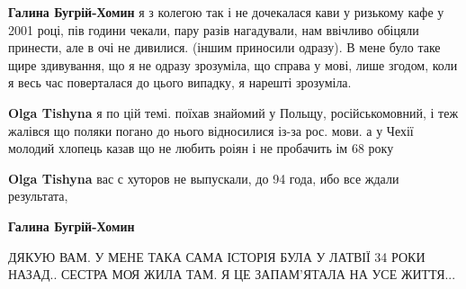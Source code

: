 \begin{itemize}
\begin{itemize}
 
\textbf{Галина Бугрій-Хомин} я з колегою так і не дочекалася кави у ризькому
кафе у 2001 році, пів години чекали, пару разів нагадували, нам ввічливо
обіцяли принести, але в очі не дивилися. (іншим приносили одразу). В мене було
таке щире здивування, що я не одразу зрозуміла, що справа у мові, лише згодом,
коли я весь час поверталася до цього випадку, я нарешті зрозуміла. \Smiley[1.0][yellow]

\begin{itemize}
 
\textbf{Olga Tishyna} я по цій темі. поїхав знайомий у Польщу, російськомовний, і
теж жалівся що поляки погано до нього відносилися із-за рос. мови. а у Чехії
молодий хлопець казав що не любить роіян і не пробачить ім 68 року

 
\textbf{Olga Tishyna} вас с хуторов не выпускали, до 94 года, ибо все ждали результата,
\end{itemize}

 
\textbf{Галина Бугрій-Хомин} 

ДЯКУЮ ВАМ. У МЕНЕ ТАКА САМА ІСТОРІЯ БУЛА У ЛАТВІЇ 34 РОКИ НАЗАД.. СЕСТРА МОЯ ЖИЛА
ТАМ. Я ЦЕ ЗАПАМ'ЯТАЛА НА УСЕ ЖИТТЯ...


 

\end{itemize}
\end{itemize}
